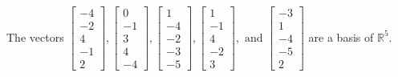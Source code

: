 \begin{exercise}
\begin{exerciseStatement}
  \end{exerciseStatement}
  \begin{exerciseAnswer}
   The vectors \(\left[\begin{array}{r}
-4 \\
-2 \\
4 \\
-1 \\
2
\end{array}\right] , \left[\begin{array}{r}
0 \\
-1 \\
3 \\
4 \\
-4
\end{array}\right] , \left[\begin{array}{r}
1 \\
-4 \\
-2 \\
-3 \\
-5
\end{array}\right] , \left[\begin{array}{r}
1 \\
-1 \\
4 \\
-2 \\
3
\end{array}\right] , \text{ and } \left[\begin{array}{r}
-3 \\
1 \\
-4 \\
-5 \\
2
\end{array}\right]\) 
  	 are  a basis of \(\mathbb{R}^5\).
  


  \end{exerciseAnswer}
\end{exercise}